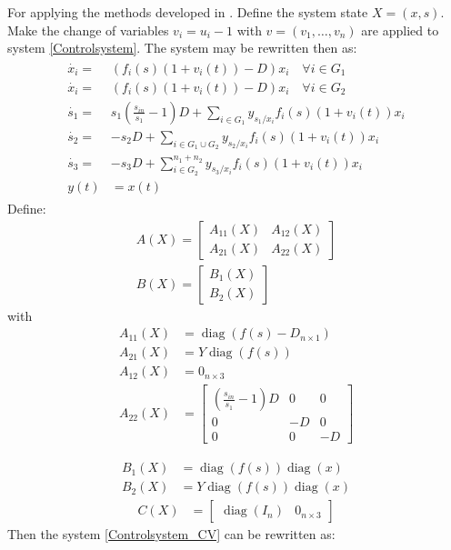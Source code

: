 \documentclass[processes,article,submit,moreauthors,pdftex]{Definitions/mdpi}
\DeclareMathOperator{\diag}{diag}
\begin{document}
For applying the methods developed in \cite{Cimen2004}. Define the system state $X = (x,s)$. Make the change of variables $v_i = u_i - 1$ with $v = (v_1,\dots,v_n)$ are applied to system \eqref{Controlsystem}. The system may be rewritten then as:
\begin{align} 
\label{Controlsystem_CV}
\begin{array}{cl}
\dot{x_i} =& \left(f_i(s)(1+v_i(t)) -D \right)x_i \quad \forall i \in G_1\\
\dot{x_i} =& \left(f_i(s)(1+v_i(t)) -D \right)x_i \quad \forall i \in G_2\\
\dot{s_1} =& \displaystyle s_1\left(\frac{s_{in}}{s_1}-1\right)D+\sum\limits_{i \in G_1}y_{s_1/x_i}f_i(s)(1+v_i(t)) x_i  \\
\dot{s_2} = & \displaystyle -s_2D+\sum\limits_{i \in G_1 \cup G_2}y_{s_2/x_i}f_i(s)(1+v_i(t))x_i	  \\
\dot{s_3} =&  \displaystyle -s_3D+\sum\limits_{i \in G_2}^{n_1+n_2}y_{s_3/x_i}f_i(s)(1+v_i(t)) x_i \\
y(t) & =x(t)
\end{array}
\end{align}	
Define: 
\begin{align}
\label{A_matrix} A\left (X\right) = \begin{bmatrix}
A_{11}(X) & A_{12}(X) \\ A_{21}(X) & A_{22}(X)
\end{bmatrix} \\
\label{B_matrix} B\left (X\right) = \begin{bmatrix}
B_1(X) \\ B_2(X)
\end{bmatrix} 
\end{align}
with 
\begin{align}
A_{11}(X) &= \diag(f(s)- D_{n\times 1} ) \\
A_{21}(X) &=  Y\diag(f(s))\\
A_{12}(X) &=  0_{n \times 3} \\
A_{22}(X) &= \begin{bmatrix} \left(\frac{s_{in}}{s_1}-1\right)D & 0 & 0 \\ 
0 &-D & 0 \\ 
0 & 0 &-D \end{bmatrix}
\end{align}

\begin{align}
B_1(X) &= \diag(f(s))\diag(x)  \\
B_2(X) &= Y\diag(f(s))\diag(x)
\end{align}
\begin{align}
C(X) & = \begin{bmatrix}
\diag(I_n) & 0_{n\times 3}
\end{bmatrix}
\end{align} 
Then the system \eqref{Controlsystem_CV} can be rewritten as:
\end{document}
